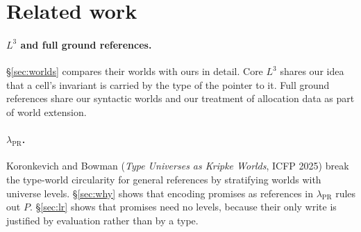 \documentclass[11pt]{article}
\begin{document}
\section{Related work}

\paragraph{$L^3$ and full ground references.}
\S\ref{sec:worlds} compares their worlds with ours in detail. Core $L^3$
shares our idea that a cell's invariant is carried by the type of the pointer
to it. Full ground references share our syntactic worlds and our treatment
of allocation data as part of world extension.

\paragraph{$\lambda_{\mathrm{PR}}$.}
Koronkevich and Bowman (\emph{Type Universes as Kripke Worlds}, ICFP 2025)
break the type-world circularity for general references by stratifying
worlds with universe levels. \S\ref{sec:why} shows that encoding promises as
references in $\lambda_{\mathrm{PR}}$ rules out $P$. \S\ref{sec:lr} shows
that promises need no levels, because their only write is justified by
evaluation rather than by a type.
\end{document}

